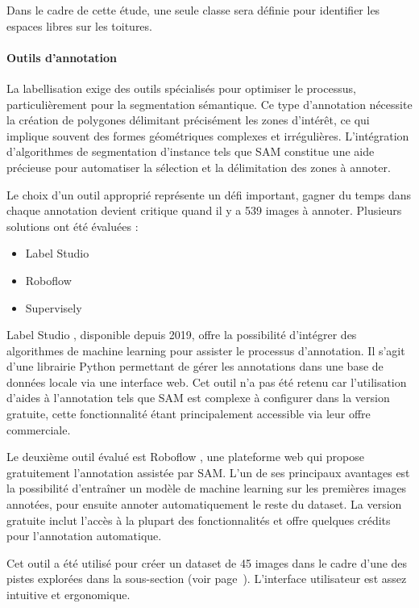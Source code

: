 Dans le cadre de cette étude, une seule classe sera définie pour identifier les espaces libres sur les toitures.

\paragraph{Outils d'annotation}
La labellisation exige des outils spécialisés pour optimiser le processus, particulièrement pour la segmentation sémantique. Ce type d'annotation nécessite la création de polygones délimitant précisément les zones d'intérêt, ce qui implique souvent des formes géométriques complexes et irrégulières. L'intégration d'algorithmes de segmentation d'instance tels que SAM constitue une aide précieuse pour automatiser la sélection et la délimitation des zones à annoter.

Le choix d'un outil approprié représente un défi important, gagner du temps dans chaque annotation devient critique quand il y a 539 images à annoter. Plusieurs solutions ont été évaluées :
\begin{itemize}
    \item Label Studio \cite{label_studio_open_nodate}
    \item Roboflow \cite{roboflow_roboflow_nodate}
    \item Supervisely \cite{supervisely_supervisely_nodate}
\end{itemize}

Label Studio \cite{label_studio_open_nodate}, disponible depuis 2019, offre la possibilité d'intégrer des algorithmes de machine learning pour assister le processus d'annotation. Il s'agit d'une librairie Python permettant de gérer les annotations dans une base de données locale via une interface web. Cet outil n'a pas été retenu car l'utilisation d'aides à l'annotation tels que SAM \cite{label_studio_label_nodate} est complexe à configurer dans la version gratuite, cette fonctionnalité étant principalement accessible via leur offre commerciale.

Le deuxième outil évalué est Roboflow \cite{roboflow_roboflow_nodate}, une plateforme web qui propose gratuitement l'annotation assistée par SAM. L'un de ses principaux avantages est la possibilité d'entraîner un modèle de machine learning sur les premières images annotées, pour ensuite annoter automatiquement le reste du dataset. La version gratuite inclut l'accès à la plupart des fonctionnalités et offre quelques crédits pour l'annotation automatique.

Cet outil a été utilisé pour créer un dataset de 45 images dans le cadre d'une des pistes explorées dans la sous-section \textit{} (voir page~\pageref{subsubsec:fine_tuning_sam}). L'interface utilisateur est assez intuitive et ergonomique.

